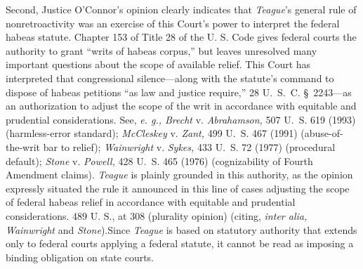 {{{  Second, Justice O'Connor's opinion clearly indicates that
\emph{Teague}'s general rule of nonretroactivity was an exercise of
this Court's power to interpret the federal habeas statute. Chapter
153 of Title 28 of the U. S. Code gives federal courts the authority
to grant ``writs of habeas corpus,'' but leaves unresolved many
important questions about the scope of available relief. This Court has
interpreted that congressional silence---along with the statute's
command to dispose of habeas petitions ``as law and justice require,''
28 U.~S.~C. \S~2243---as an authorization to adjust the scope of
the writ in accordance with equitable and prudential considerations.
See, \emph{e. g., Brecht} v. \emph{Abrahamson,} 507 U.~S. 619 (1993)
(harmless-error standard); \emph{McCleskey} v. \emph{Zant,} 499 U.~S. 467
(1991) (abuse-of-the-writ bar to relief); \emph{Wainwright} v. \emph{Sykes,}
433 U.~S. 72 (1977) (procedural default); \emph{Stone} v. \emph{Powell,}
428 U.~S. 465 (1976) (cognizability of Fourth Amendment claims).
\emph{Teague} is plainly grounded in this authority, as the opinion
expressly situated the rule it announced in this line of cases adjusting
the scope of federal habeas relief in accordance with equitable and
prudential considerations. 489 U. S., at 308 (plurality opinion)
(citing, \emph{inter alia, Wainwright} and \emph{Stone}).\footnotemark[15] Since
\emph{Teague} is based on statutory authority that \newpage  extends only to
federal courts applying a federal statute, it cannot be read as imposing
a binding obligation on state courts.

}}}
